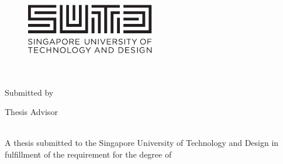\documentclass[
11pt, %
oneside, %
english, %
singlespacing, %
headsepline, %
]{MastersDoctoralThesis} %
\author{Zhanming \textsc{Jie}} %
\begin{document}
\frontmatter %

\pagestyle{plain} %


\begin{titlepage}
\begin{center}

\begin{figure}
\centering
\includegraphics[width=0.5\textwidth]{Figures/SUTD}
\end{figure}

 \hfill\break\\[2.3cm]

{\huge \bfseries \ttitle}\\[2cm] %


Submitted by\\[1cm]
\authorname %

\vspace{4em}

Thesis Advisor\\[1cm]
\supname %

\vspace{4em}

\pillarname\\[1.5cm] %

\large{A thesis submitted to the Singapore University of Technology and Design in fulfillment of the requirement for the degree of \degreename}\\[1cm] %


{\large \the\year}\\[4cm] %

\vfill
\end{center}
\end{titlepage}
\end{document}
